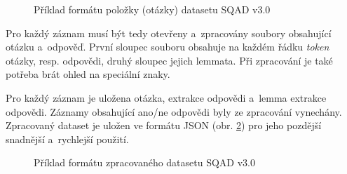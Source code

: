\begin{figure}[hbt]
	\centering
	\caption{Příklad formátu položky (otázky) datasetu SQAD v3.0}
	\label{question_format}
\end{figure}

Pro každý záznam musí být tedy otevřeny a~zpracovány soubory obsahující otázku a~odpověď. První sloupec souboru obsahuje na každém řádku \emph{token} otázky, resp. odpovědi, druhý sloupec jejich lemmata. Při zpracování je také potřeba brát ohled na speciální znaky.\par
Pro každý záznam je uložena otázka, extrakce odpovědi a~lemma extrakce odpovědi. Záznamy obsahující ano/ne odpovědi byly ze zpracování vynechány. Zpracovaný dataset je uložen ve formátu JSON (obr. \ref{fig:sqad_processed}) pro jeho pozdější snadnější a~rychlejší použití.\pagebreak

\begin{figure}[hbt]
	\centering
	\caption{Příklad formátu zpracovaného datasetu SQAD v3.0}
	\label{fig:sqad_processed}
\end{figure}

